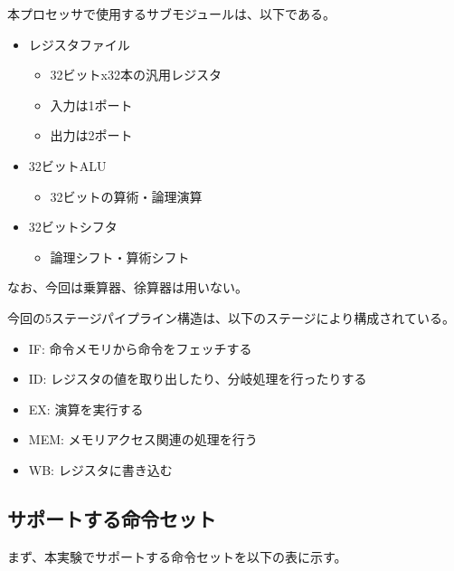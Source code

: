 \documentclass{jarticle}[11pt]
\begin{document}
\vspace{0.2in}

本プロセッサで使用するサブモジュールは、以下である。

\begin{itemize}
\item レジスタファイル
  \begin{itemize}
    \item 32ビットx32本の汎用レジスタ
    \item 入力は1ポート
    \item 出力は2ポート
  \end{itemize}
  \item 32ビットALU
  \begin{itemize}
    \item 32ビットの算術・論理演算
  \end{itemize}
  \item 32ビットシフタ
    \begin{itemize}
      \item 論理シフト・算術シフト
    \end{itemize}
\end{itemize}

なお、今回は乗算器、徐算器は用いない。

今回の5ステージパイプライン構造は、以下のステージにより構成されている。

\begin{itemize}
  \item IF: 命令メモリから命令をフェッチする
  \item ID: レジスタの値を取り出したり、分岐処理を行ったりする
  \item EX: 演算を実行する
  \item MEM: メモリアクセス関連の処理を行う
  \item WB: レジスタに書き込む
\end{itemize}


\subsection{サポートする命令セット}

まず、本実験でサポートする命令セットを以下の表に示す。
\end{document}
